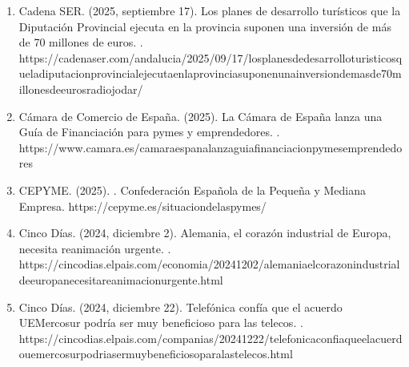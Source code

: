 \documentclass[letterpaper,10pt,spanish]{sphinxmanual}
\begin{document}
\begin{enumerate}
\item {} 
\sphinxAtStartPar
Cadena SER. (2025, septiembre 17). Los planes de desarrollo turísticos que la Diputación Provincial ejecuta en la provincia suponen una inversión de más de 70 millones de euros. . https://cadenaser.com/andalucia/2025/09/17/los\sphinxhyphen{}planes\sphinxhyphen{}de\sphinxhyphen{}desarrollo\sphinxhyphen{}turisticos\sphinxhyphen{}que\sphinxhyphen{}la\sphinxhyphen{}diputacion\sphinxhyphen{}provincial\sphinxhyphen{}ejecuta\sphinxhyphen{}en\sphinxhyphen{}la\sphinxhyphen{}provincia\sphinxhyphen{}suponen\sphinxhyphen{}una\sphinxhyphen{}inversion\sphinxhyphen{}de\sphinxhyphen{}mas\sphinxhyphen{}de\sphinxhyphen{}70\sphinxhyphen{}millones\sphinxhyphen{}de\sphinxhyphen{}euros\sphinxhyphen{}radio\sphinxhyphen{}jodar/

\item {} 
\sphinxAtStartPar
Cámara de Comercio de España. (2025). La Cámara de España lanza una Guía de Financiación para pymes y emprendedores. . https://www.camara.es/camara\sphinxhyphen{}espana\sphinxhyphen{}lanza\sphinxhyphen{}guia\sphinxhyphen{}financiacion\sphinxhyphen{}pymes\sphinxhyphen{}emprendedores

\item {} 
\sphinxAtStartPar
CEPYME. (2025). . Confederación Española de la Pequeña y Mediana Empresa. https://cepyme.es/situacion\sphinxhyphen{}de\sphinxhyphen{}las\sphinxhyphen{}pymes/

\item {} 
\sphinxAtStartPar
Cinco Días. (2024, diciembre 2). Alemania, el corazón industrial de Europa, necesita reanimación urgente. . https://cincodias.elpais.com/economia/2024\sphinxhyphen{}12\sphinxhyphen{}02/alemania\sphinxhyphen{}el\sphinxhyphen{}corazon\sphinxhyphen{}industrial\sphinxhyphen{}de\sphinxhyphen{}europa\sphinxhyphen{}necesita\sphinxhyphen{}reanimacion\sphinxhyphen{}urgente.html

\item {} 
\sphinxAtStartPar
Cinco Días. (2024, diciembre 22). Telefónica confía que el acuerdo UE\sphinxhyphen{}Mercosur podría ser muy beneficioso para las telecos. . https://cincodias.elpais.com/companias/2024\sphinxhyphen{}12\sphinxhyphen{}22/telefonica\sphinxhyphen{}confia\sphinxhyphen{}que\sphinxhyphen{}el\sphinxhyphen{}acuerdo\sphinxhyphen{}ue\sphinxhyphen{}mercosur\sphinxhyphen{}podria\sphinxhyphen{}ser\sphinxhyphen{}muy\sphinxhyphen{}beneficioso\sphinxhyphen{}para\sphinxhyphen{}las\sphinxhyphen{}telecos.html


\end{enumerate}
\end{document}
